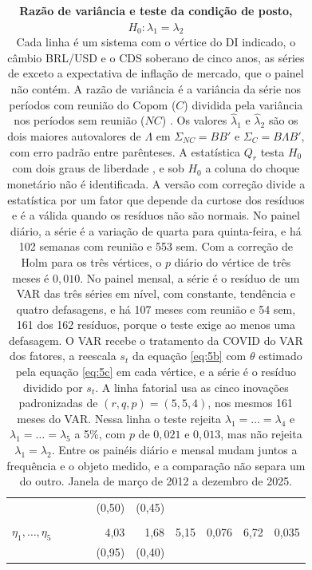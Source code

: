 \documentclass[preprint,authoryear,review,12pt]{elsarticle}
\begin{document}
\begin{table}[H]
\begin{threeparttable}
\begin{tabular*}{\textwidth}{@{\extracolsep{\fill}}l D{,}{{,}}{1.2} D{,}{{,}}{1.2} D{,}{{,}}{1.2} D{,}{{,}}{3} D{,}{{,}}{3} D{,}{{,}}{2} D{,}{{,}}{3} D{,}{{,}}{2} D{,}{{,}}{3}@{}}
                     &      &      &      & (0,50) & (0,45) &       &       &       &       \\
\addlinespace
{} \\
\quad $\eta_1,\dots,\eta_5$ & & & & 4,03 & 1,68 & 5,15 & 0,076 & 6,72 & 0,035 \\
                     &      &      &      & (0,95) & (0,40) &       &       &       &       \\
\bottomrule
\end{tabular*}
\caption{\textbf{Razão de variância e teste da condição de posto, $H_0\colon\lambda_1=\lambda_2$}\\{Cada linha é um sistema com o vértice do DI indicado, o câmbio BRL/USD e o CDS soberano de cinco anos, as séries de \cite{goncalves2025} exceto a expectativa de inflação de mercado, que o painel não contém. A razão de variância é a variância da série nos períodos com reunião do Copom ($C$) dividida pela variância nos períodos sem reunião ($NC$) \citep{rigobonsack2004}. Os valores $\hat{\lambda}_1$ e $\hat{\lambda}_2$ são os dois maiores autovalores de $\Lambda$ em $\Sigma_{NC}=BB'$ e $\Sigma_C=B\Lambda B'$, com erro padrão entre parênteses. A estatística $Q_r$ testa $H_0$ com dois graus de liberdade \citep{lutkepohl2021,lange2021}, e sob $H_0$ a coluna do choque monetário não é identificada. A versão com correção divide a estatística por um fator que depende da curtose dos resíduos e é a válida quando os resíduos não são normais. No painel diário, a série é a variação de quarta para quinta-feira, e há 102 semanas com reunião e 553 sem. Com a correção de Holm para os três vértices, o $p$ diário do vértice de três meses é $0{,}010$. No painel mensal, a série é o resíduo de um VAR das três séries em nível, com constante, tendência e quatro defasagens, e há 107 meses com reunião e 54 sem, 161 dos 162 resíduos, porque o teste exige ao menos uma defasagem. O VAR recebe o tratamento da COVID do VAR dos fatores, a reescala $s_t$ da equação \ref{eq:5b} com $\theta$ estimado pela equação \ref{eq:5c} em cada vértice, e a série é o resíduo dividido por $s_t$. A linha fatorial usa as cinco inovações padronizadas de $(r,q,p)=(5,5,4)$, nos mesmos 161 meses do VAR. Nessa linha o teste rejeita $\lambda_1=\dots=\lambda_4$ e $\lambda_1=\dots=\lambda_5$ a 5\%, com $p$ de $0{,}021$ e $0{,}013$, mas não rejeita $\lambda_1=\lambda_2$. Entre os painéis diário e mensal mudam juntos a frequência e o objeto medido, e a comparação não separa um do outro. Janela de março de 2012 a dezembro de 2025.}}
\label{tab:het_frequency}
\end{threeparttable}
\end{table}
\end{document}
